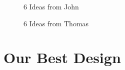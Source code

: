 \documentclass[5pt]{article} %
\begin{document}
\begin{figure}[h!]
\centering
{}
\caption{6 Ideas from John}
\end{figure}

\begin{figure}[h!]
\centering
{}
\caption{6 Ideas from Thomas}
\end{figure}

\clearpage
\section{Our Best Design}
\end{document}
